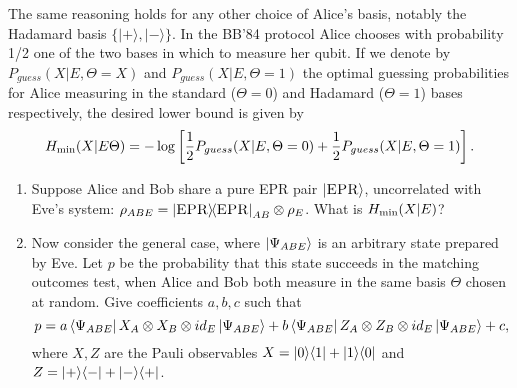 \documentclass[12pt]{article}
\begin{document}
\begin{enumerate}
The same reasoning holds for any other choice of Alice's basis, notably the Hadamard basis $\{|+\rangle,|-\rangle\}$. In the BB'84 protocol Alice chooses with probability 1/2 one of the two bases in which to measure her qubit. If we denote by $P_{guess}(X|E,\Theta=X)$ and $P_{guess}(X|E,\Theta=1)$ the optimal guessing probabilities for Alice measuring in the standard ($\Theta=0$) and Hadamard ($\Theta=1$) bases respectively, the desired lower bound is given by
$$H_{\rm min}(X|E\Theta) = -\log \left[\frac{1}{2}P_{guess}(X|E,\Theta=0)+\frac{1}{2}P_{guess}(X|E,\Theta=1)\right].$$
\begin{enumerate}
\item Suppose Alice and Bob share a pure EPR pair $\ket{\textsc{EPR}}$, uncorrelated with Eve's system: $\rho_{ABE} = \ket{\textsc{EPR}}\!\!\bra{\textsc{EPR}}_{AB} \otimes \rho_E$. What is $H_{\rm min}(X|E)$?
%
%
\item Now consider the general case, where $\ket{\Psi_{ABE}}$ is an arbitrary state prepared by Eve. Let $p$ be the probability that this state succeeds in the matching outcomes test, when Alice and Bob both measure in the same basis $\Theta$ chosen at random. Give coefficients $a,b,c$ such that
$$p = a \bra{\Psi_{ABE}} X_A \otimes X_B \otimes id_E \ket{\Psi_{ABE}} + b\bra{\Psi_{ABE}} Z_A \otimes Z_B \otimes id_E \ket{\Psi_{ABE}} + c,$$
where $X,Z$ are the Pauli observables $X = \ket{0}\!\bra{1} + \ket{1}\!\bra{0}$ and $Z = \ket{+}\!\bra{-} + \ket{-}\!\bra{+}$.

\end{enumerate}
\end{enumerate}
\end{document}
